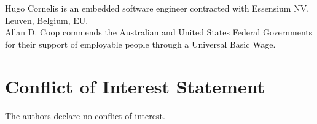 \documentclass[11pt,3p,twocolumn]{JMN}
\begin{document}
Hugo Cornelis is an embedded software engineer contracted with Essensium NV, Leuven, Belgium, EU.\\
Allan D. Coop commends the Australian and United States Federal Governments for their support of employable people through a Universal Basic Wage.


\section{Conflict of Interest Statement}

The authors declare no conflict of interest.



\end{document}
